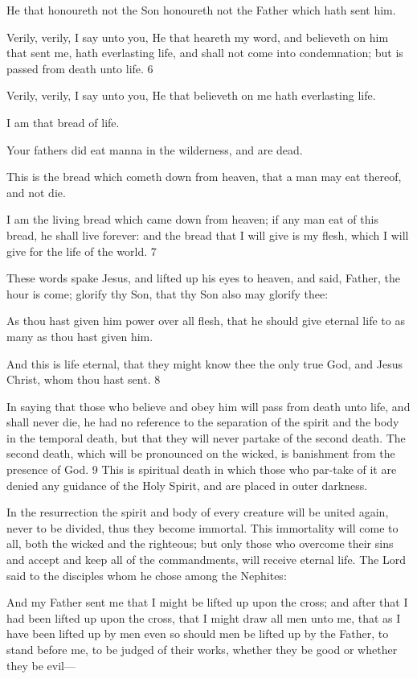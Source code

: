 He that honoureth not the Son honoureth not the Father which hath sent him.

Verily, verily, I say unto you, He that heareth my word, and believeth on him that sent me,
hath everlasting life, and shall not come into condemnation; but is passed from death unto
life. 6

Verily, verily, I say unto you, He that believeth on me hath everlasting life.

I am that bread of life.

Your fathers did eat manna in the wilderness, and are dead.

This is the bread which cometh down from heaven, that a man may eat thereof, and not die.

I am the living bread which came down from heaven; if any man eat of this bread, he shall
live forever: and the bread that I will give is my flesh, which I will give for the life of the
world. 7

These words spake Jesus, and lifted up his eyes to heaven, and said, Father, the hour is come;
glorify thy Son, that thy Son also may glorify thee:

As thou hast given him power over all flesh, that he should give eternal life to as many as
thou hast given him.

And this is life eternal, that they might know thee the only true God, and Jesus Christ, whom
thou hast sent. 8

In saying that those who believe and obey him will pass from death unto life, and shall never
die, he had no reference to the separation of the spirit and the body in the temporal death, but
that they will never partake of the second death. The second death, which will be pronounced
on the wicked, is banishment from the presence of God. 9 This is spiritual death in which
those who par-take of it are denied any guidance of the Holy Spirit, and are placed in outer
darkness.

In the resurrection the spirit and body of every creature will be united again, never to be
divided, thus they become immortal. This immortality will come to all, both the wicked and
the righteous; but only those who overcome their sins and accept and keep all of the
commandments, will receive eternal life. The Lord said to the disciples whom he chose
among the Nephites:

And my Father sent me that I might be lifted up upon the cross; and after that I had been
lifted up upon the cross, that I might draw all men unto me, that as I have been lifted up by
men even so should men be lifted up by the Father, to stand before me, to be judged of their
works, whether they be good or whether they be evil—

